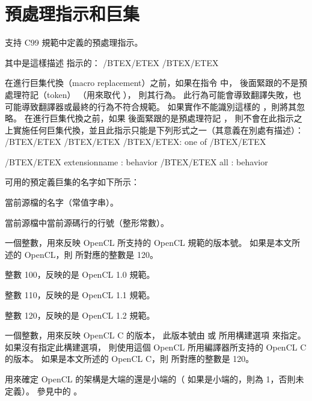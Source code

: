 \section[section:pp_macro]{預處理指示和巨集}

支持 C99 規範中定義的預處理指示。

其中是這樣描述  指示的：
\startclc
/BTEX/ETEX /BTEX{}/ETEX
\stopclc

在進行巨集代換（macro replacement）之前，如果在指令  中，
  後面緊跟的不是預處理符記（token） {}
（用來取代 {}），
則其行為。
此行為可能會導致翻譯失敗，也可能導致翻譯器或最終的行為不符合規範。
如果實作不能識別這樣的 ，則將其忽略。
在進行巨集代換之前，如果  後面緊跟的是預處理符記 {}，
則不會在此指示之上實施任何巨集代換，並且此指示只能是下列形式之一（其意義在別處有描述）：
\startclc
/BTEX/ETEX /BTEX/ETEX
	/BTEX/ETEX: one of /BTEX/ETEX

/BTEX/ETEX extensionname : behavior
/BTEX/ETEX all : behavior
\stopclc

可用的預定義巨集的名字如下所示：

當前源檔的名字（常值字串）。

當前源檔中當前源碼行的行號（整形常數）。

一個整數，用來反映 OpenCL  所支持的 OpenCL 規範的版本號。
如果是本文所述的 OpenCL，則  所對應的整數是 120。

整數 100，反映的是 OpenCL 1.0 規範。

整數 110，反映的是 OpenCL 1.1 規範。

整數 120，反映的是 OpenCL 1.2 規範。

一個整數，用來反映 OpenCL C 的版本，
此版本號由  或 
 所用構建選項  來指定。
如果沒有指定此構建選項，
則使用這個 OpenCL  所用編譯器所支持的 OpenCL C 的版本。
如果是本文所述的 OpenCL C，則  所對應的整數是 120。

用來確定 OpenCL  的架構是大端的還是小端的（
如果是小端的，則為 1，否則未定義）。
參見中的 。

